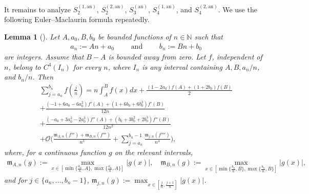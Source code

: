 \documentclass[a4paper]{article}
\newtheorem{lemma}[theorem]{Lemma}
\newcommand{\bigO}{\mathcal{O}}
\numberwithin{equation}{section}
\begin{document}
It remains to analyze $S_2^{(1,\mathrm{an})}$, $S_2^{(2,\mathrm{an})}$, $S_3^{(\mathrm{an})}$, $S_4^{(1,\mathrm{an})}$, and $S_4^{(2,\mathrm{an})}$. We use the following Euler--Maclaurin formula repeatedly.
\begin{lemma}[{\cite[Lemma~3.4]{C2021}}]
\label{lemma:Riemann sum NEW}
Let $A,a_0,B,b_0$ be bounded functions of $n\in\mathbb N$ such that
\begin{align*}
& a_{n} := An + a_{0} \qquad \mbox{ and } \qquad b_{n} := Bn + b_{0}
\end{align*}
are integers. Assume that $B-A$ is bounded away from zero. Let $f$, independent of $n$, belong to $C^4(I_n)$ for every $n$, where $I_n$ is any interval containing $A,B,a_n/n$, and $b_n/n$. Then
\begin{align}
&  \sum_{j=a_{n}}^{b_{n}}f(\tfrac{j}{n}) = n \int_{A}^{B}f(x)dx + \frac{(1-2a_{0})f(A)+(1+2b_{0})f(B)}{2}  \nonumber \\
& + \frac{(-1+6a_{0}-6a_{0}^{2})f'(A)+(1+6b_{0}+6b_{0}^{2})f'(B)}{12n} \nonumber \\
& + \frac{(-a_{0}+3a_{0}^{2}-2a_{0}^{3})f''(A)+(b_{0}+3b_{0}^{2}+2b_{0}^{3})f''(B)}{12n^{2}} \nonumber \\
& + \bigO \bigg( \frac{\mathfrak{m}_{A,n}(f''')+\mathfrak{m}_{B,n}(f''')}{n^{3}} + \sum_{j=a_{n}}^{b_{n}-1} \frac{\mathfrak{m}_{j,n}(f'''')}{n^{4}} \bigg), \label{sum f asymp gap NEW}
\end{align}
where, for a continuous function $g$ on the relevant intervals,
\begin{align*}
\mathfrak{m}_{A,n}(g) := \max_{x \in [\min\{\frac{a_{n}}{n},A\},\max\{\frac{a_{n}}{n},A\}]}|g(x)|, \quad \mathfrak{m}_{B,n}(g) := \max_{x \in [\min\{\frac{b_{n}}{n},B\},\max\{\frac{b_{n}}{n},B\}]}|g(x)|,
\end{align*}
and for $j \in \{a_{n},\ldots,b_{n}-1\}$, $\mathfrak{m}_{j,n}(g) := \max_{x \in [\frac{j}{n},\frac{j+1}{n}]}|g(x)|$.
\end{lemma}
\end{document}
